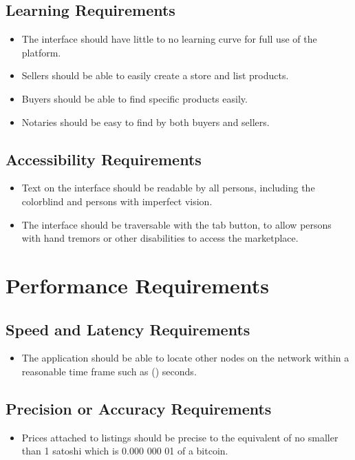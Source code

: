 \documentclass{article}
\begin{document}
\subsection{Learning Requirements}
\begin{itemize}
\item
The interface should have little to no learning curve for full use of the platform.

\item
Sellers should be able to easily create a store and list products.

\item
Buyers should be able to find specific products easily.

\item
Notaries should be easy to find by both buyers and sellers.
\end{itemize}


\subsection{Accessibility Requirements}
\begin{itemize}
\item
Text on the interface should be readable by all persons, including the colorblind and persons with imperfect vision.

\item
The interface should be traversable with the tab button, to allow persons with hand tremors or other disabilities to access the marketplace.


\end{itemize}

\section{Performance Requirements}
\subsection{Speed and Latency Requirements}
\begin{itemize}
\item
The application should be able to locate other nodes on the network within a reasonable time frame such as () seconds.
\end{itemize}


\subsection{Precision or Accuracy Requirements}
\begin{itemize}
\item
Prices attached to listings should be precise to the equivalent of no smaller than 1 satoshi which is 0.000 000 01 of a bitcoin.
\end{itemize}
\end{document}
